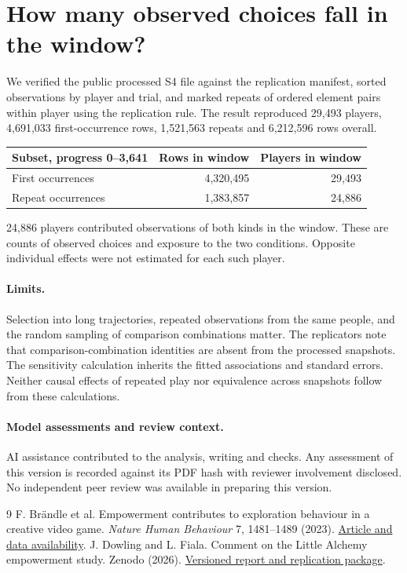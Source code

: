 \documentclass[11pt]{article}
\begin{document}
\section{How many observed choices fall in the window?}
We verified the public processed S4 file against the replication manifest, sorted observations by player and trial, and marked repeats of ordered element pairs within player using the replication rule. The result reproduced 29,493 players, 4,691,033 first-occurrence rows, 1,521,563 repeats and 6,212,596 rows overall.
\begin{center}\begin{tabular}{lrr}\toprule
Subset, progress 0--3,641 & Rows in window & Players in window\\\midrule
First occurrences & 4,320,495 & 29,493\\
Repeat occurrences & 1,383,857 & 24,886\\\bottomrule\end{tabular}\end{center}
24,886 players contributed observations of both kinds in the window. These are counts of observed choices and exposure to the two conditions. Opposite individual effects were not estimated for each such player.
\paragraph{Limits.} Selection into long trajectories, repeated observations from the same people, and the random sampling of comparison combinations matter. The replicators note that comparison-combination identities are absent from the processed snapshots. The sensitivity calculation inherits the fitted associations and standard errors. Neither causal effects of repeated play nor equivalence across snapshots follow from these calculations.
\paragraph{Model assessments and review context.} AI assistance contributed to the analysis, writing and checks. Any assessment of this version is recorded against its PDF hash with reviewer involvement disclosed. No independent peer review was available in preparing this version.
\begin{thebibliography}{9}
 F. Br\"andle et al. Empowerment contributes to exploration behaviour in a creative video game. \emph{Nature Human Behaviour} 7, 1481--1489 (2023). \href{https://doi.org/10.1038/s41562-023-01661-2}{Article and data availability}.
 J. Dowling and L. Fiala. Comment on the Little Alchemy empowerment study. Zenodo (2026). \href{https://doi.org/10.5281/zenodo.24409714}{Versioned report and replication package}.
\end{thebibliography}
\end{document}
